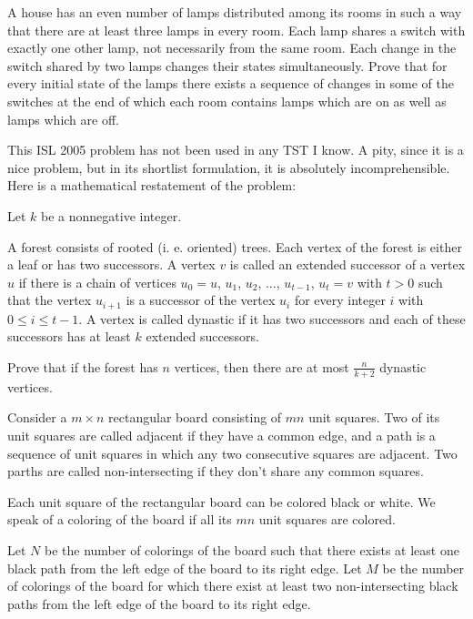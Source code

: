 \item[\textbf{C1.}]
A house has an even number of lamps distributed among its rooms in such a way that there are at least three lamps in every room. Each lamp shares a switch with exactly one other lamp, not necessarily from the same room. Each change in the switch shared by two lamps changes their states simultaneously. Prove that for every initial state of the lamps there exists a sequence of changes in some of the switches at the end of which each room contains lamps which are on as well as lamps which are off.

\item[\textbf{C2.}]
This ISL 2005 problem has not been used in any TST I know. A pity, since it is a nice problem, but in its shortlist formulation, it is absolutely incomprehensible. Here is a mathematical restatement of the problem:


Let 
$k$
 be a nonnegative integer.


A forest consists of rooted (i. e. oriented) trees. Each vertex of the forest is either a leaf or has two successors. A vertex 
$v$
 is called an 
extended successor
 of a vertex 
$u$
 if there is a chain of vertices 
$u_{0}=u$,
$u_{1}$, 
$u_{2}$, 
$\dots$, 
$u_{t-1}$, 
$u_{t}=v$
 with 
$t>0$
 such that the vertex 
$u_{i+1}$
 is a successor of the vertex 
$u_{i}$
 for every integer 
$i$
 with 
$0\leq i\leq t-1$.
 A vertex is called 
dynastic
 if it has two successors and each of these successors has at least 
$k$
 extended successors.


Prove that if the forest has 
$n$
 vertices, then there are at most 
$\frac{n}{k+2}$
 dynastic vertices.

\item[\textbf{C3.}]
Consider a 
$m\times n$
 rectangular board consisting of 
$mn$
 unit squares. Two of its unit squares are called 
adjacent
 if they have a common edge, and a 
path
 is a sequence of unit squares in which any two consecutive squares are adjacent. Two parths are called 
non-intersecting
 if they don't share any common squares.


Each unit square of the rectangular board can be colored black or white. We speak of a 
coloring
 of the board if all its 
$mn$
 unit squares are colored.


Let 
$N$
 be the number of colorings of the board such that there exists at least one black path from the left edge of the board to its right edge. Let 
$M$
 be the number of colorings of the board for which there exist at least two non-intersecting black paths from the left edge of the board to its right edge.


